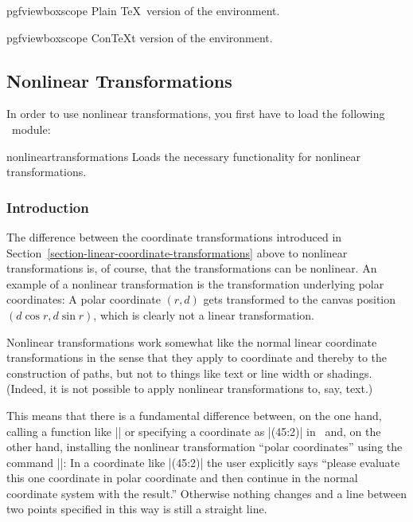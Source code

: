 \begin{plainenvironment}{{pgfviewboxscope}}
  Plain \TeX\ version of the environment.
\end{plainenvironment}

\begin{contextenvironment}{{pgfviewboxscope}}
  Con\TeX t version of the environment.
\end{contextenvironment}





\subsection{Nonlinear Transformations}
\label{section-nonlinear-transformations}
In order to use nonlinear transformations, you first have to load the
following \pgfname\ module:

\begin{pgfmodule}{nonlineartransformations}
  Loads the necessary functionality for nonlinear transformations.
\end{pgfmodule}


\subsubsection{Introduction}

The difference between the coordinate transformations introduced in
Section~\ref{section-linear-coordinate-transformations} above to
nonlinear transformations is, of course, that the transformations can
be nonlinear. An example of a nonlinear transformation is the
transformation underlying polar coordinates: A polar coordinate
$(r,d)$ gets transformed to the canvas position $(d\cos r,d\sin r)$,
which is clearly not a linear transformation.

Nonlinear transformations work somewhat like the normal linear
coordinate transformations in the sense that they apply to coordinate
and thereby to the construction of paths, but not to things like text
or line width or shadings. (Indeed, it is not possible to apply
nonlinear transformations to, say, text.)

This means that there is a fundamental
difference between, on the one hand, calling a function like
|\pgfpointpolar| or specifying a coordinate as |(45:2)| in \tikzname\
and, on the other hand, installing the nonlinear transformation
``polar coordinates'' using the command |\pgftransformnonlinear|: In a
coordinate like |(45:2)| the user explicitly says ``please evaluate
this one  coordinate in polar coordinate and then continue in the
normal coordinate system with the result.'' Otherwise nothing changes
and a line between two points specified in this way is still a
straight line.

